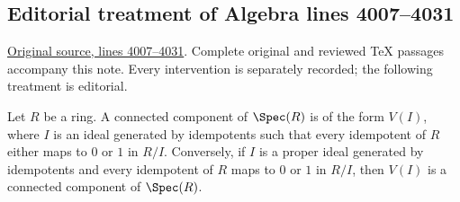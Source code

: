 \subsection{Editorial treatment of Algebra lines 4007--4031}

\hypertarget{algebra-context-019}{}

\noindent\href{https://github.com/stacks/stacks-project/blob/a04446e57ec1fbc252a871afcec7752fb2807b14/algebra.tex\#L4007}{Original source, lines 4007--4031}. Complete original and reviewed TeX passages accompany this note. Every intervention is separately recorded; the following treatment is editorial.


\begin{lemma}
\label{editorial-source-lemma-connected-component}
Let $R$ be a ring.
A connected component of
$\Spec(R)$ is of the form $V(I)$,
where $I$ is an ideal generated by idempotents
such that every idempotent of $R$ either maps to
$0$ or $1$ in $R/I$.
Conversely, if $I$ is a proper ideal generated by idempotents and
every idempotent of $R$ maps to $0$ or $1$ in $R/I$, then $V(I)$
is a connected component of $\Spec(R)$.
\end{lemma}

